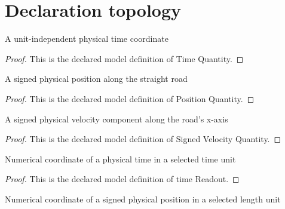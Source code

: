 \section{Declaration topology}
\begin{definition}
  \label{def:physics:phyx-mini-0671:phyxminiproblems-problemphyxmini0671-timequantity}
  A unit-independent physical time coordinate
\end{definition}
\begin{proof}
  This is the declared model definition of Time Quantity.
\end{proof}
\begin{definition}
  \label{def:physics:phyx-mini-0671:phyxminiproblems-problemphyxmini0671-positionquantity}
  A signed physical position along the straight road
\end{definition}
\begin{proof}
  This is the declared model definition of Position Quantity.
\end{proof}
\begin{definition}
  \label{def:physics:phyx-mini-0671:phyxminiproblems-problemphyxmini0671-signedvelocityquantity}
  A signed physical velocity component along the road's x-axis
\end{definition}
\begin{proof}
  This is the declared model definition of Signed Velocity Quantity.
\end{proof}
\begin{definition}
  \label{def:physics:phyx-mini-0671:phyxminiproblems-problemphyxmini0671-timereadout}
  Numerical coordinate of a physical time in a selected time unit
\end{definition}
\begin{proof}
  This is the declared model definition of time Readout.
\end{proof}
\begin{definition}
  \label{def:physics:phyx-mini-0671:phyxminiproblems-problemphyxmini0671-positionreadout}
  Numerical coordinate of a signed physical position in a selected length unit
\end{definition}
